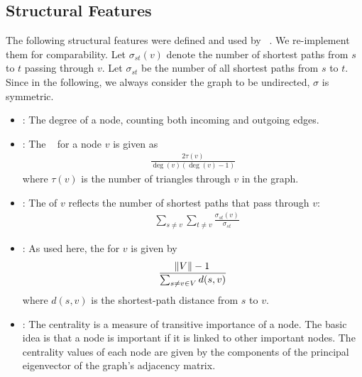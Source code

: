 \documentclass[
	fontsize=10pt, %
	twoside=true, %
	secnumdepth=1, %
  toc=indentunnumbered %
]{kaobook}
\begin{document}
\subsection{Structural Features} The following structural features were defined
and used by \citeauthor{nielsen_MachineLearningSupport_2019}~\cite{nielsen_MachineLearningSupport_2019}. We re-implement
them for comparability. Let $\sigma_{st}(v)$ denote the number of shortest paths
from $s$ to $t$ passing through $v$. Let $\sigma_{st}$ be the number of all shortest
paths from $s$ to $t$. Since in the following, we always consider the graph to
be undirected, $\sigma$ is symmetric.

\begin{itemize}
\item {}: The degree of a node, counting both incoming and
  outgoing edges.
\item {}: The 
 ~\cite{brandes_NetworkAnalysisMethodological_2005}
  for a
  node $v$ is given as
  \begin{align*}
    \frac{2 \tau(v)}{\deg(v)(\deg(v)-1)}
  \end{align*}
  where $\tau(v)$ is the number of triangles through $v$ in the graph.
\item {}: The  of $v$
  reflects the number of shortest paths that pass through $v$:
  \begin{align*}
    & \sum_{s \not= v} \sum_{t \not= v} \frac{\sigma_{st}(v)}{\sigma_{st}}
  \end{align*}
\item {}: As used here, the  for $v$ is given by
  \begin{align*}
    \frac{\norm{V}-1}{\sum_{s \not= v \in V} d(s,v)}
  \end{align*}
  where $d(s,v)$ is the shortest-path distance from $s$ to $v$.
\item {}: The  centrality is a
  measure of transitive importance of a node. The basic idea is that a node is
  important if it is linked to other important nodes. The centrality values of
  each node are given by the components of the principal eigenvector of the graph's
  adjacency matrix.
\end{itemize}
\end{document}

